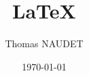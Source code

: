 \documentclass[a4paper,12pt,titlepage]{report}
\title{ \LaTeX }
\author{Thomas NAUDET}
\date{\today}
\begin{document}
%
%



\renewcommand{\contentsname}{Contents}
\tableofcontents %

\listoffigures

\listoftables
\newpage


\newpage
\end{document}
